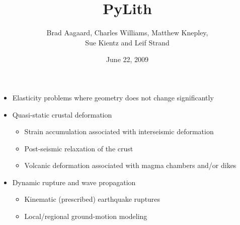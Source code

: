 \documentclass[pdftex,cig,slideColor]{pp4slides}
\title{PyLith}
\subtitle{}
\author{Brad Aagaard, Charles Williams, Matthew Knepley, \\[10pt]
  Sue Kientz and Leif Strand}
\date{June 22, 2009}
\begin{document}
\maketitle
\vfill


  \begin{itemize}
  \item Elasticity problems where geometry does not change significantly
  \item Quasi-static crustal deformation
    \begin{itemize}
    \item Strain accumulation associated with interseismic deformation
    \item Post-seismic relaxation of the crust
    \item Volcanic deformation associated with magma chambers and/or dikes
    \end{itemize}
  \item Dynamic rupture and wave propagation
    \begin{itemize}
    \item Kinematic (prescribed) earthquake ruptures
    \item Local/regional ground-motion modeling
    \end{itemize}
  \end{itemize}


\end{document}
